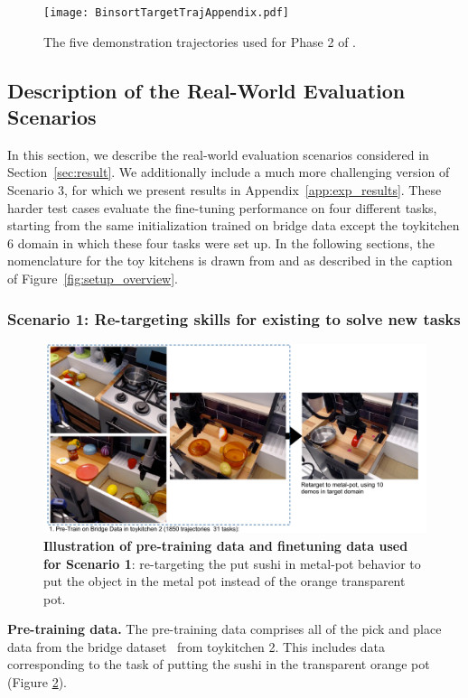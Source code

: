 \documentclass[conference]{IEEEtran}
\begin{document}
\begin{figure}
\centering
  \texttt{[image: BinsortTargetTrajAppendix.pdf]}
  \caption{\label{fig:app_targ_rollout_sim} \footnotesize {The five demonstration trajectories used for Phase 2 of \methodname.}}
\end{figure}

\subsection{Description of the Real-World Evaluation Scenarios}
\label{app:tasks}
In this section, we describe the real-world evaluation scenarios considered in Section~\ref{sec:result}. We additionally include a much more challenging version of Scenario 3, for which we present results in Appendix~\ref{app:exp_results}. These harder test cases evaluate the fine-tuning performance on four different tasks, starting from the same initialization trained on bridge data except the toykitchen 6 domain in which these four tasks were set up. In the following sections, the nomenclature for the toy kitchens is drawn from \citet{ebert2021bridge} and as described in the caption of Figure~\ref{fig:setup_overview}.

\subsubsection{Scenario 1: Re-targeting skills for existing to solve new tasks}

\begin{figure}
\centering
  \includegraphics[width=0.83\linewidth]{scenario1_overview.pdf}
  \caption{\footnotesize \textbf{Illustration of pre-training data and finetuning data used for Scenario 1}: re-targeting the put sushi in metal-pot behavior to put the object in the metal pot instead of the orange transparent pot.}
  \label{fig:retargeting_setup}
\end{figure}


\textbf{Pre-training data.} The pre-training data comprises all of the pick and place data from the bridge dataset~\citep{ebert2021bridge} from toykitchen 2. This includes data corresponding to the task of putting the sushi in the transparent orange pot (Figure \ref{fig:retargeting_setup}).  
\end{document}
